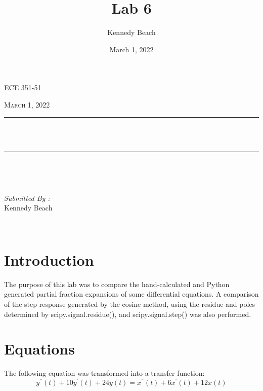 \documentclass[12pt]{report}
\title{Lab 6}
\author{Kennedy Beach}
\date{March 1, 2022}
\makeatletter
\let\thetitle\@title
\makeatother
\begin{document}
\begin{titlepage}
\centering
\vspace*{0.5 cm}
\begin{center}    \textsc{\Large   ECE 351-51 }\\[2.0 cm]
\end{center}%
\textsc{\Large March 1, 2022}\\[0.5 cm] %
\rule{\linewidth}{0.2 mm} \\[0.4 cm]
{ \huge \bfseries \thetitle}\\
\rule{\linewidth}{0.2 mm} \\[1.5 cm]
\begin{minipage}{0.4\textwidth}
\begin{flushleft} \large
\end{flushleft}
\end{minipage}~
\begin{minipage}{0.4\textwidth}
\begin{flushright} \large
\emph{Submitted By :} \\
Kennedy Beach
\end{flushright}
\end{minipage}\\[2 cm]
\end{titlepage}
\tableofcontents
\pagebreak
\renewcommand{\thesection}{\arabic{section}}
\section{Introduction}
The purpose of this lab was to compare the hand-calculated and Python generated partial fraction expansions of some differential equations. A comparison of the step response generated by the cosine method, using the residue and poles determined by scipy.signal.residue(), and scipy.signal.step() was also performed.
\section{Equations}
The following equation was transformed into a transfer function:
\begin{equation*}
y^{''}(t) + 10y^{'}(t) + 24y(t) = x^{''}(t) + 6x^{'}(t) + 12x(t)
\end{equation*}
\end{document}
